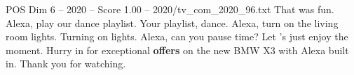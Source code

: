 \begin{textsample}{POS Dim 6 – 2020 – Score 1.00 – 2020/tv\_com\_2020\_96.txt}  \label{ex:f6_pos_046}
That was fun.
Alexa, play our dance playlist.
Your playlist, dance.
Alexa, turn on the living room lights.
Turning on lights.
Alexa, can you pause time?
Let 's just enjoy the moment.
Hurry in for exceptional \textbf{offers} on the new BMW X3 with Alexa built in.
Thank you for watching.

\end{textsample}
